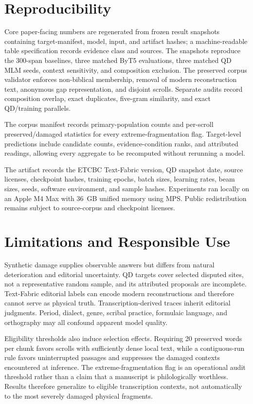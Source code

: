 \documentclass[10pt,twocolumn,a4paper]{article}
\begin{document}
\section{Reproducibility}

Core paper-facing numbers are regenerated from frozen result snapshots containing target-manifest, model, input, and artifact hashes; a machine-readable table specification records evidence class and sources. The snapshots reproduce the 300-span baselines, three matched ByT5 evaluations, three matched QD MLM seeds, context sensitivity, and composition exclusion. The preserved corpus validator enforces non-biblical membership, removal of modern reconstruction text, anonymous gap representation, and disjoint scrolls. Separate audits record composition overlap, exact duplicates, five-gram similarity, and exact QD/training parallels.

The corpus manifest records primary-population counts and per-scroll preserved/damaged statistics for every extreme-fragmentation flag. Target-level predictions include candidate counts, evidence-condition ranks, and attributed readings, allowing every aggregate to be recomputed without rerunning a model.

The artifact records the ETCBC Text-Fabric version, QD snapshot date, source licenses, checkpoint hashes, training epochs, batch sizes, learning rates, beam sizes, seeds, software environment, and sample hashes. Experiments ran locally on an Apple M4 Max with 36~GB unified memory using MPS. Public redistribution remains subject to source-corpus and checkpoint licenses.

\section{Limitations and Responsible Use}

Synthetic damage supplies observable answers but differs from natural deterioration and editorial uncertainty. QD targets cover selected disputed sites, not a representative random sample, and its attributed proposals are incomplete. Text-Fabric editorial labels can encode modern reconstructions and therefore cannot serve as physical truth. Transcription-derived traces inherit editorial judgments. Period, dialect, genre, scribal practice, formulaic language, and orthography may all confound apparent model quality.

Eligibility thresholds also induce selection effects. Requiring 20 preserved words per chunk favors scrolls with sufficiently dense local text, while a contiguous-run rule favors uninterrupted passages and suppresses the damaged contexts encountered at inference. The extreme-fragmentation flag is an operational audit threshold rather than a claim that a manuscript is philologically worthless. Results therefore generalize to eligible transcription contexts, not automatically to the most severely damaged physical fragments.
\end{document}
